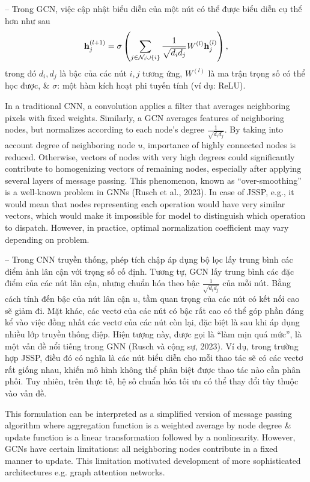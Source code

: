 \documentclass{article}
\begin{document}
\begin{itemize}
\begin{itemize}
\begin{itemize}
            -- Trong GCN, việc cập nhật biểu diễn của một nút có thể được biểu diễn cụ thể hơn như sau
            \begin{equation*}
                {\bf h}_j^{(l + 1)} = \sigma\left(\sum_{j\in{\cal N}_i\cup\{i\}} \frac{1}{\sqrt{d_id_j}}W^{(l)}{\bf h}_j^{(l)} \right),
            \end{equation*}
            trong đó $d_i,d_j$ là bậc của các nút $i,j$ tương ứng, $W^{(l)}$ là ma trận trọng số có thể học được, \& $\sigma$: một hàm kích hoạt phi tuyến tính (ví dụ: ReLU).

            In a traditional CNN, a convolution applies a filter that averages neighboring pixels with fixed weights. Similarly, a GCN averages features of neighboring nodes, but normalizes according to each node's degree $\frac{1}{\sqrt{d_id_j}}$. By taking into account degree of neighboring node $u$, importance of highly connected nodes is reduced. Otherwise, vectors of nodes with very high degrees could significantly contribute to homogenizing vectors of remaining nodes, especially after applying several layers of message passing. This phenomenon, known as ``over-smoothing'' is a well-known problem in GNNs (Rusch et al., 2023). In case of JSSP, e.g., it would mean that nodes representing each operation would have very similar vectors, which would make it impossible for model to distinguish which operation to dispatch. However, in practice, optimal normalization coefficient may vary depending on problem.

            -- Trong CNN truyền thống, phép tích chập áp dụng bộ lọc lấy trung bình các điểm ảnh lân cận với trọng số cố định. Tương tự, GCN lấy trung bình các đặc điểm của các nút lân cận, nhưng chuẩn hóa theo bậc $\frac{1}{\sqrt{d_id_j}}$ của mỗi nút. Bằng cách tính đến bậc của nút lân cận $u$, tầm quan trọng của các nút có kết nối cao sẽ giảm đi. Mặt khác, các vectơ của các nút có bậc rất cao có thể góp phần đáng kể vào việc đồng nhất các vectơ của các nút còn lại, đặc biệt là sau khi áp dụng nhiều lớp truyền thông điệp. Hiện tượng này, được gọi là ``làm mịn quá mức'', là một vấn đề nổi tiếng trong GNN (Rusch và cộng sự, 2023). Ví dụ, trong trường hợp JSSP, điều đó có nghĩa là các nút biểu diễn cho mỗi thao tác sẽ có các vectơ rất giống nhau, khiến mô hình không thể phân biệt được thao tác nào cần phân phối. Tuy nhiên, trên thực tế, hệ số chuẩn hóa tối ưu có thể thay đổi tùy thuộc vào vấn đề.

            This formulation can be interpreted as a simplified version of message passing algorithm where aggregation function is a weighted average by node degree \& update function is a linear transformation followed by a nonlinearity. However, GCNs have certain limitations: all neighboring nodes contribute in a fixed manner to update. This limitation motivated development of more sophisticated architectures e.g. graph attention networks.


\end{itemize}
\end{itemize}
\end{itemize}
\end{document}
